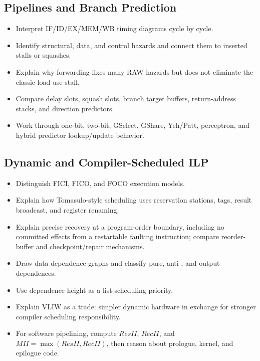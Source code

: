 \subsection*{Pipelines and Branch Prediction}
\begin{itemize}
    \item Interpret IF/ID/EX/MEM/WB timing diagrams cycle by cycle.
    \item Identify structural, data, and control hazards and connect them to inserted stalls or squashes.
    \item Explain why forwarding fixes many RAW hazards but does not eliminate the classic load-use stall.
    \item Compare delay slots, squash slots, branch target buffers, return-address stacks, and direction predictors.
    \item Work through one-bit, two-bit, GSelect, GShare, Yeh/Patt, perceptron, and hybrid predictor lookup/update behavior.
\end{itemize}

\subsection*{Dynamic and Compiler-Scheduled ILP}
\begin{itemize}
    \item Distinguish FICI, FICO, and FOCO execution models.
    \item Explain how Tomasulo-style scheduling uses reservation stations, tags, result broadcast, and register renaming.
    \item Explain precise recovery at a program-order boundary, including no committed effects from a restartable faulting instruction; compare reorder-buffer and checkpoint/repair mechanisms.
    \item Draw data dependence graphs and classify pure, anti-, and output dependences.
    \item Use dependence height as a list-scheduling priority.
    \item Explain VLIW as a trade: simpler dynamic hardware in exchange for stronger compiler scheduling responsibility.
    \item For software pipelining, compute $ResII$, $RecII$, and $MII=\max(ResII,RecII)$, then reason about prologue, kernel, and epilogue code.
\end{itemize}


